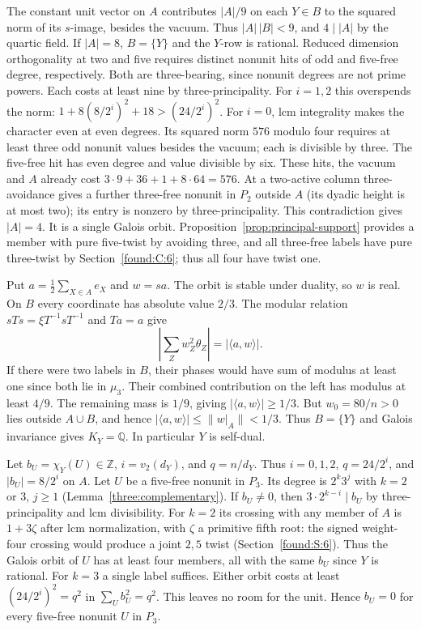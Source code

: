 \documentclass[11pt,a4paper]{article}
\numberwithin{equation}{section}
\theoremstyle{remark}
\newcommand{\ZZ}{\mathbb Z}
\begin{document}
The constant unit vector on $A$ contributes $|A|/9$ on each
$Y\in B$ to the squared norm of its $s$-image, besides the vacuum.
Thus $|A|\,|B|<9$, and $4\mid |A|$ by the quartic field. If
$|A|=8$, $B=\{Y\}$ and the $Y$-row is rational. Reduced dimension
orthogonality at two and five requires distinct nonunit hits of odd
and five-free degree, respectively. Both are three-bearing, since
nonunit degrees are not prime powers. Each costs at least nine by
three-principality. For $i=1,2$ this overspends the norm:
$1+8(8/2^i)^2+18>(24/2^i)^2$. For $i=0$, lcm integrality makes the
character even at even degrees. Its squared norm $576$ modulo four
requires at least three odd nonunit values besides the vacuum;
each is divisible by three. The five-free hit has even degree and
value divisible by six. These hits, the vacuum and $A$ already cost
$3\cdot9+36+1+8\cdot64=576$. At a two-active column three-avoidance
gives a further three-free nonunit in $P_2$ outside $A$ (its dyadic
height is at most two); its entry is nonzero by three-principality.
This contradiction gives $|A|=4$. It is a single Galois orbit.
Proposition~\ref{prop:principal-support} provides a member with pure five-twist by
avoiding three, and all three-free labels have pure three-twist
by Section~\ref{found:C:6}; thus all four have twist one.

Put $a=\frac12\sum_{X\in A} e_X$ and $w=sa$. The orbit is stable under duality, so $w$ is real. On $B$ every coordinate has absolute value $2/3$. The modular relation $sTs=\xi T^{-1}sT^{-1}$ and $Ta=a$ give
\[
       \left|\sum_Z w_Z^2\theta_Z\right|=|\langle a,w\rangle|.
\]
If there were two labels in $B$, their phases would have sum of modulus at least one since both lie in $\mu_3$. Their combined contribution on the left has modulus at least $4/9$. The remaining mass is $1/9$, giving $|\langle a,w\rangle|\ge1/3$. But $w_0=80/n>0$ lies outside $A\cup B$, and hence $|\langle a,w\rangle|\le\|w|_A\|<1/3$. Thus $B=\{Y\}$ and Galois invariance gives $K_Y=\mathbb Q$. In particular $Y$ is self-dual.

Let $b_U=\chi_Y(U)\in\ZZ$, $i=v_2(d_Y)$, and $q=n/d_Y$. Thus $i=0,1,2$, $q=24/2^i$, and $|b_U|=8/2^i$ on $A$. Let $U$ be a five-free nonunit in $P_3$. Its degree is $2^k3^j$ with $k=2$ or $3$, $j\ge1$ (Lemma~\ref{three:complementary}). If $b_U\ne0$, then $3\cdot2^{k-i}\mid b_U$ by three-principality and lcm divisibility. For $k=2$ its crossing with any member of $A$ is $1+3\zeta$ after lcm normalization, with $\zeta$ a primitive fifth root: the signed weight-four crossing would produce a joint $2,5$ twist (Section~\ref{found:S:6}). Thus the Galois orbit of $U$ has at least four members, all with the same $b_U$ since $Y$ is rational. For $k=3$ a single label suffices. Either orbit costs at least $(24/2^i)^2=q^2$ in $\sum_U b_U^2=q^2$. This leaves no room for the unit. Hence $b_U=0$ for every five-free nonunit $U$ in $P_3$.
\end{document}
